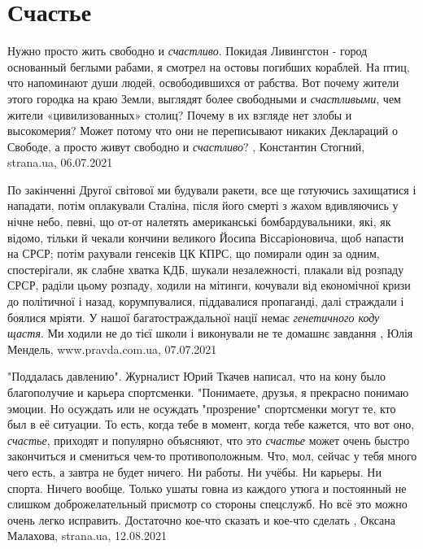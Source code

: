  
 
 
 
 
\chapter{Счастье}

Нужно просто жить свободно и \emph{счастливо}.  Покидая Ливингстон - город основанный
беглыми рабами, я смотрел на остовы погибших кораблей. На птиц, что напоминают
души людей, освободившихся от рабства.  Вот почему жители этого городка на краю
Земли, выглядят более свободными и \emph{счастливыми}, чем жители «цивилизованных»
столиц? Почему в их взгляде нет злобы и высокомерия? Может потому что они не
переписывают никаких Деклараций о Свободе, а просто живут свободно и \emph{счастливо}?
, 
Константин Стогний, strana.ua, 06.07.2021


По закінченні Другої світової ми будували ракети, все ще готуючись захищатися і
нападати, потім оплакували Сталіна, після його смерті з жахом вдивляючись у
нічне небо, певні, що от-от налетять американські бомбардувальники, які, як
відомо, тільки й чекали кончини великого Йосипа Віссаріоновича, щоб напасти на
СРСР; потім рахували генсеків ЦК КПРС, що помирали один за одним, спостерігали,
як слабне хватка КДБ, шукали незалежності, плакали від розпаду СРСР, раділи
цьому розпаду, ходили на мітинги, кочували від економічної кризи до політичної
і назад, корумпувалися, піддавалися пропаганді, далі страждали і боялися
мріяти.  У нашої багатостраждальної нації немає \emph{генетичного коду щастя}.
Ми ходили не до тієї школи і виконували не те домашнє завдання
, 
Юлія Мендель, www.pravda.com.ua, 07.07.2021

"Поддалась давлению".  Журналист Юрий Ткачев написал, что на кону было
благополучие и карьера спортсменки.  "Понимаете, друзья, я прекрасно понимаю
эмоции. Но осуждать или не осуждать "прозрение" спортсменки могут те, кто был в
её ситуации. То есть, когда тебе в момент, когда тебе кажется, что вот оно,
\emph{счастье}, приходят и популярно объясняют, что это \emph{счастье} может очень быстро
закончиться и смениться чем-то противоположным. Что, мол, сейчас у тебя много
чего есть, а завтра не будет ничего.  Ни работы. Ни учёбы. Ни карьеры. Ни
спорта. Ничего вообще. Только ушаты говна из каждого утюга и постоянный не
слишком доброжелательный присмотр со стороны спецслужб.  Но всё это можно очень
легко исправить. Достаточно кое-что сказать и кое-что сделать
, 
Оксана Малахова, strana.ua, 12.08.2021
